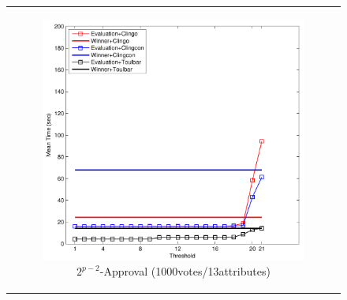 
\begin{figure}[!ht]
	\centering
	\setlength{\tabcolsep}{0mm}
	\begin{tabular}{c}
  \begin{subfigure}[b]{0.5\textwidth}
		\includegraphics[width=\textwidth]{figs/expAppMSCICP_1000v_13i.pdf}
		\captionsetup{font=scriptsize}
		\caption{$2^{p-2}$-Approval (1000votes/13attributes)}
		\label{fig:comparison:eval:1}
	\end{subfigure}
  \begin{subfigure}[b]{0.5\textwidth}

\end{subfigure}
\end{tabular}
\end{figure}
